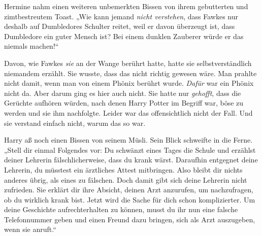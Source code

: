 Hermine nahm einen weiteren unbemerkten Bissen von ihrem gebutterten und zimtbestreutem Toast. „Wie kann jemand \emph{nicht verstehen}, dass Fawkes nur deshalb auf Dumbledores Schulter reitet, weil er davon überzeugt ist, dass Dumbledore ein guter Mensch ist? Bei einem dunklen Zauberer würde er das niemals machen!“

Davon, wie Fawkes \emph{sie} an der Wange berührt hatte, hatte sie selbstverständlich niemandem erzählt. Sie wusste, dass das nicht richtig gewesen wäre. Man prahlte nicht damit, wenn man von einem Phönix berührt wurde. \emph{Dafür} war ein Phönix nicht da.
%
%
%
Aber darum ging es hier auch nicht. Sie hatte nur \emph{gehofft}, dass die Gerüchte aufhören würden, nach denen Harry Potter im Begriff war, böse zu werden und sie ihm nachfolgte.
%
Leider war das offensichtlich nicht der Fall.
%
Und sie verstand einfach nicht, warum das so war.

Harry aß noch einen Bissen von seinem Müsli. Sein Blick schweifte in die Ferne. „Stell dir einmal Folgendes vor: Du schwänzt eines Tages die Schule und erzählst deiner Lehrerin fälschlicherweise, dass du krank wärst. Daraufhin entgegnet deine Lehrerin, du müsstest ein ärztliches Attest mitbringen. Also bleibt dir nichts anderes übrig, als eines zu fälschen. Doch damit gibt sich deine Lehrerin nicht zufrieden. Sie erklärt dir ihre Absicht, deinen Arzt anzurufen, um nachzufragen, ob du wirklich krank bist. Jetzt wird die Sache für dich schon komplizierter. Um deine Geschichte aufrechterhalten zu können, musst du ihr nun eine falsche Telefonnummer geben und einen Freund dazu bringen, sich als Arzt auszugeben, wenn sie anruft.“

